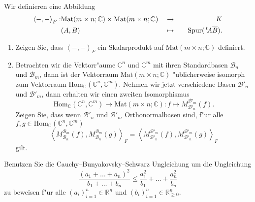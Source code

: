 \documentclass[a4,11pt]{article}
\begin{document}
\begin{aufgabe}[4 Punkte]
Wir definieren eine Abbildung 
\begin{align*}
\left<-,-\right>_{F} : &\text{Mat}(m \times n; \mathbb{C}) \times\text{Mat}(m \times n; \mathbb{C}) &&\to &&&K\\
&(A,B)&&\mapsto &&&\text{Spur}(\,^t\!A \overline{B}).
\end{align*}
\begin{enumerate}
\item Zeigen Sie, dass $\left<-,-\right>_{F}$ ein Skalarprodukt auf $\text{Mat}(m \times n; \mathbb{C})$ definiert.
\item Betrachten wir die Vektorr"aume $\mathbb{C}^n$ und
  $\mathbb{C}^m$ mit ihren Standardbasen $\mathcal{B}_n$ und
  $\mathcal{B}_m$, dann ist der Vektorraum $\text{Mat}(m \times n;
  \mathbb{C})$ "ublicherweise isomorph zum Vektorraum
  $\text{Hom}_\mathbb{C}(\mathbb{C}^n, \mathbb{C}^m)$. Nehmen wir
  jetzt verschiedene Basen $\mathcal{B}'_n$ und $\mathcal{B}'_m$, dann
  erhalten wir einen zweiten Isomorphismus
\[
\text{Hom}_\mathbb{C}(\mathbb{C}^n, \mathbb{C}^m) \to \text{Mat}(m \times n; \mathbb{C}) : f \mapsto M_{\mathcal{B}'_n}^{\mathcal{B}'_m}(f).
\]
Zeigen Sie, dass wenn $\mathcal{B}'_n$ und $\mathcal{B}'_m$ Orthonormalbasen sind, f"ur alle $f, g \in \text{Hom}_\mathbb{C}(\mathbb{C}^n, \mathbb{C}^m)$
\[
\left<M_{\mathcal{B}_n}^{\mathcal{B}_m}(f),M_{\mathcal{B}_n}^{\mathcal{B}_m}(g)\right>_{F} = \left<M_{\mathcal{B}'_n}^{\mathcal{B}'_m}(f),M_{\mathcal{B}'_n}^{\mathcal{B}'_m}(g)\right>_{F}
\]
gilt.
\begin{center}

\end{center}
\end{enumerate}
\end{aufgabe}

\begin{aufgabe}[4 Punkte]
Benutzen Sie die Cauchy–Bunyakovsky–Schwarz Ungleichung um die Ungleichung
\[
\frac{(a_1 + \dots +  a_n)^2}{b_1 + \dots + b_n} \leq \frac{a_1^2}{b_1} + \dots + \frac{a_n^2}{b_n}
\]
zu beweisen f"ur alle $(a_i)_{i = 1}^n \in \mathbb{R}^n$ und $(b_i)_{i=1}^n \in \mathbb{R}^n_{\geq 0}$.
\end{aufgabe}
\end{document}
